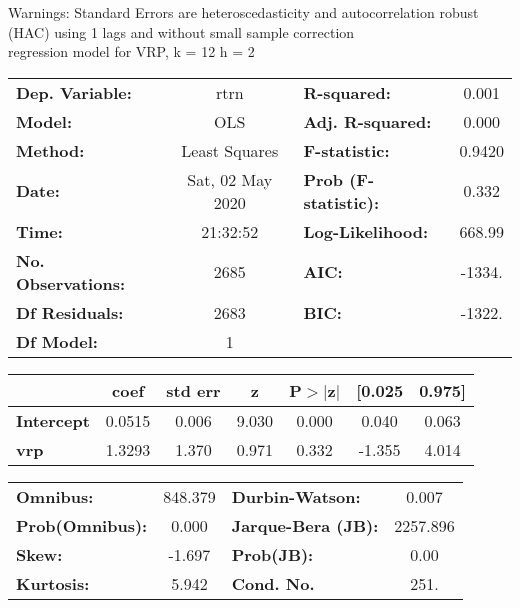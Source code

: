 Warnings: \newline
 [1] Standard Errors are heteroscedasticity and autocorrelation robust (HAC) using 1 lags and without small sample correction\\ 

regression model for VRP, k = 12 h = 2\begin{center}
\begin{tabular}{lclc}
\toprule
\textbf{Dep. Variable:}    &       rtrn       & \textbf{  R-squared:         } &     0.001   \\
\textbf{Model:}            &       OLS        & \textbf{  Adj. R-squared:    } &     0.000   \\
\textbf{Method:}           &  Least Squares   & \textbf{  F-statistic:       } &    0.9420   \\
\textbf{Date:}             & Sat, 02 May 2020 & \textbf{  Prob (F-statistic):} &    0.332    \\
\textbf{Time:}             &     21:32:52     & \textbf{  Log-Likelihood:    } &    668.99   \\
\textbf{No. Observations:} &        2685      & \textbf{  AIC:               } &    -1334.   \\
\textbf{Df Residuals:}     &        2683      & \textbf{  BIC:               } &    -1322.   \\
\textbf{Df Model:}         &           1      & \textbf{                     } &             \\
\bottomrule
\end{tabular}
\begin{tabular}{lcccccc}
                   & \textbf{coef} & \textbf{std err} & \textbf{z} & \textbf{P$> |$z$|$} & \textbf{[0.025} & \textbf{0.975]}  \\
\midrule
\textbf{Intercept} &       0.0515  &        0.006     &     9.030  &         0.000        &        0.040    &        0.063     \\
\textbf{vrp}       &       1.3293  &        1.370     &     0.971  &         0.332        &       -1.355    &        4.014     \\
\bottomrule
\end{tabular}
\begin{tabular}{lclc}
\textbf{Omnibus:}       & 848.379 & \textbf{  Durbin-Watson:     } &    0.007  \\
\textbf{Prob(Omnibus):} &   0.000 & \textbf{  Jarque-Bera (JB):  } & 2257.896  \\
\textbf{Skew:}          &  -1.697 & \textbf{  Prob(JB):          } &     0.00  \\
\textbf{Kurtosis:}      &   5.942 & \textbf{  Cond. No.          } &     251.  \\
\bottomrule
\end{tabular}
\end{center}

